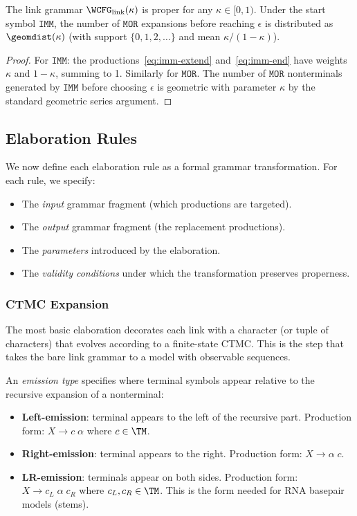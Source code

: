 \begin{proposition}
The link grammar $\WCFG_{\mathrm{link}}(\kappa)$ is proper for
any $\kappa \in [0,1)$.  Under the start symbol $\texttt{IMM}$,
the number of $\texttt{MOR}$ expansions
before reaching $\epsilon$ is distributed as $\geomdist(\kappa)$
(with support $\{0,1,2,\ldots\}$ and mean $\kappa/(1-\kappa)$).
\end{proposition}

\begin{proof}
For $\texttt{IMM}$: the productions~\eqref{eq:imm-extend}
and~\eqref{eq:imm-end} have weights $\kappa$ and $1-\kappa$,
summing to 1.  Similarly for $\texttt{MOR}$.
The number of $\texttt{MOR}$ nonterminals generated by
$\texttt{IMM}$ before choosing $\epsilon$
is geometric with parameter $\kappa$ by the standard
geometric series argument.
\end{proof}

\subsection{Elaboration Rules}

We now define each elaboration rule as a formal grammar transformation.
For each rule, we specify:
\begin{itemize}
\item The \emph{input} grammar fragment (which productions are targeted).
\item The \emph{output} grammar fragment (the replacement productions).
\item The \emph{parameters} introduced by the elaboration.
\item The \emph{validity conditions} under which the transformation preserves properness.
\end{itemize}

\subsubsection{CTMC Expansion}
\label{sec:ctmc-expansion-appendix}

The most basic elaboration decorates each link with a character
(or tuple of characters) that evolves according to a finite-state
CTMC.  This is the step that takes the bare link grammar to a model
with observable sequences.

\begin{definition}
An \emph{emission type} specifies where terminal symbols appear
relative to the recursive expansion of a nonterminal:
\begin{itemize}
\item \textbf{Left-emission}: terminal appears to the left of the recursive part.
  Production form: $X \to c\;\alpha$ where $c \in \TM$.
\item \textbf{Right-emission}: terminal appears to the right.
  Production form: $X \to \alpha\;c$.
\item \textbf{LR-emission}: terminals appear on both sides.
  Production form: $X \to c_L\;\alpha\;c_R$ where $c_L, c_R \in \TM$.
  This is the form needed for RNA basepair models (stems).
\end{itemize}
\end{definition}

